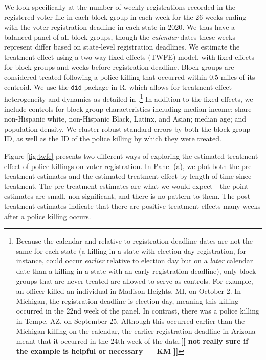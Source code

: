 \documentclass[12pt]{article}
\newcommand{\kmcomment}[1]{\textbf{\textcolor{JungleGreen}{[[ #1 --- KM ]]}}}
\begin{document}
We look specifically at the number of weekly registrations recorded in the registered voter file in each block group in each week for the 26 weeks ending with the voter registration deadline in each state in 2020. We thus have a balanced panel of all block groups, though the \textit{calendar} dates these weeks represent differ based on state-level registration deadlines. We estimate the treatment effect using a two-way fixed effects (TWFE) model, with fixed effects for block groups and weeks-before-registration-deadline. Block groups are considered treated following a police killing that occurred within 0.5 miles of its centroid. We use the \texttt{did} package in R, which allows for treatment effect heterogeneity and dynamics as detailed in \cite{Callaway2021}.\footnote{Because the calendar and relative-to-registration-deadline dates are not the same for each state (a killing in a state with election day registration, for instance, could occur \textit{earlier} relative to election day but on a \textit{later} calendar date than a killing in a state with an early registration deadline), only block groups that are never treated are allowed to serve as controls. For example, an officer killed an individual in Madison Heights, MI, on October 2. In Michigan, the registration deadline is election day, meaning this killing occurred in the 22nd week of the panel. In contrast, there was a police killing in Tempe, AZ, on September 25. Although this occurred earlier than the Michigan killing on the calendar, the earlier registration deadline in Arizona meant that it occurred in the 24th week of the data.\kmcomment{not really sure if the example is helpful or necessary}} In addition to the fixed effects, we include controls for block group characteristics including median income; share non-Hispanic white, non-Hispanic Black, Latinx, and Asian; median age; and population density. We cluster robust standard errors by both the block group ID, as well as the ID of the police killing by which they were treated.

Figure \ref{fig:twfe} presents two different ways of exploring the estimated treatment effect of police killings on voter registration. In Panel (a), we plot both the pre-treatment estimates and the estimated treatment effect by length of time since treatment. The pre-treatment estimates are what we would expect---the point estimates are small, non-significant, and there is no pattern to them. The post-treatment estimates indicate that there are positive treatment effects many weeks after a police killing occurs.
\end{document}
